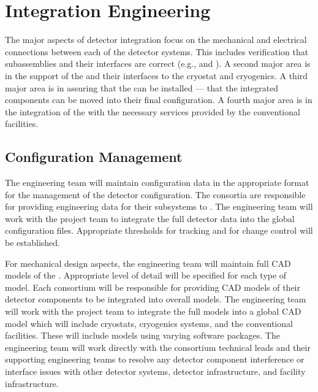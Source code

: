 \section{Integration Engineering}
\label{sec:fdsp-coord-integ-sysengr}

The major aspects of detector integration focus on the mechanical and
electrical connections between each of the detector systems. This
includes verification that subassemblies and their interfaces are
correct (e.g.,  and \single {}). A second major area is in the support of
the %
 and their interfaces to the cryostat and cryogenics. A
third major area is in assuring that the  %
can be installed ---
that the integrated components can be moved into their final
configuration. A fourth major area is in the integration of the %
 with the necessary services provided by the conventional
facilities.

\subsection{Configuration Management}
\label{sec:fdsp-coord-integ-config}

The  engineering team will maintain
configuration data in the appropriate format for the management of the
detector configuration. The consortia are responsible for providing
engineering data for their subsystems to . The
 engineering team will work with the  project team to
integrate the full detector data into the global 
configuration files. Appropriate thresholds for tracking and for
change control will be established.

For mechanical design aspects, the  engineering team
will maintain full \threed CAD models of the . Appropriate level
of detail will be specified for each type of model. Each consortium
will be responsible for providing CAD models of their detector
components to be integrated into overall models. The  engineering
team will work with the  project team to integrate the
full  models into a global  CAD model which will
include cryostats, cryogenics systems, and the conventional
facilities. These will include models using varying software
packages. The  engineering team will work directly with the
consortium technical leads and their supporting engineering teams to
resolve any detector component interference or interface issues with
other detector systems, detector infrastructure, and facility
infrastructure.

